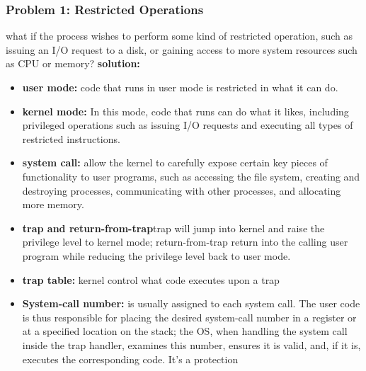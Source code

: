 \documentclass{article}
\begin{document}
\subsubsection{Problem 1: Restricted Operations}
what if the process wishes to perform some kind of restricted operation, such as issuing an I/O request to a disk, or gaining access to more system resources such as CPU or memory?
\textbf{solution: }
\begin{itemize}
    \item \textbf{user mode: }code that runs in user mode is restricted in what it can do.
    
    \item \textbf{kernel mode: }In this mode, code that runs can do what it likes, including privileged operations such as issuing I/O requests and executing all types of restricted instructions. 
    
    \item \textbf{system call: }allow the kernel to carefully expose certain key pieces of functionality to user programs, such as accessing the file system, creating and destroying processes, communicating with other processes, and allocating more memory.
    \item \textbf{trap and return-from-trap}trap will jump into kernel and raise the privilege level to kernel mode; return-from-trap return into the calling user program while reducing the privilege level back to user mode.
    \item \textbf{trap table: }kernel control what code executes upon a trap
    
    \item \textbf{System-call number: }is usually assigned to each system call. The user code is thus responsible for placing the desired system-call number in a register or at a specified location on the stack; the OS, when handling the system call inside the trap handler, examines this number, ensures it is valid, and, if it is, executes the corresponding code. It's a protection
\end{itemize}
\end{document}
